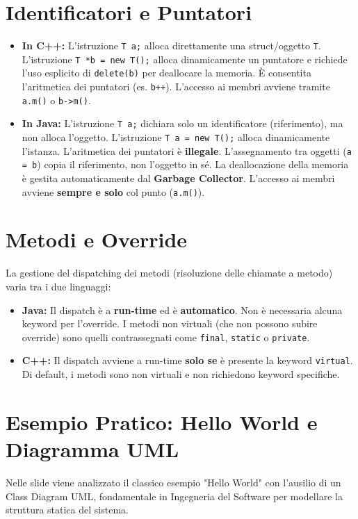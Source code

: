 \documentclass[12pt,a4paper,oneside]{book}
\begin{document}
\section{Identificatori e Puntatori}
\begin{itemize}
    \item \textbf{In C++:} L'istruzione \texttt{T a;} alloca direttamente una struct/oggetto \texttt{T}. L'istruzione \texttt{T *b = new T();} alloca dinamicamente un puntatore e richiede l'uso esplicito di \texttt{delete(b)} per deallocare la memoria. È consentita l'aritmetica dei puntatori (es. \texttt{b++}). L'accesso ai membri avviene tramite \texttt{a.m()} o \texttt{b->m()}.
    \item \textbf{In Java:} L'istruzione \texttt{T a;} dichiara solo un identificatore (riferimento), ma non alloca l'oggetto. L'istruzione \texttt{T a = new T();} alloca dinamicamente l'istanza. L'aritmetica dei puntatori è \textbf{illegale}. L'assegnamento tra oggetti (\texttt{a = b}) copia il riferimento, non l'oggetto in sé. La deallocazione della memoria è gestita automaticamente dal \textbf{Garbage Collector}. L'accesso ai membri avviene \textbf{sempre e solo} col punto (\texttt{a.m()}).
\end{itemize}

\section{Metodi e Override}
La gestione del dispatching dei metodi (risoluzione delle chiamate a metodo) varia tra i due linguaggi:
\begin{itemize}
    \item \textbf{Java:} Il dispatch è a \textbf{run-time} ed è \textbf{automatico}. Non è necessaria alcuna keyword per l'override. I metodi non virtuali (che non possono subire override) sono quelli contrassegnati come \texttt{final}, \texttt{static} o \texttt{private}.
    \item \textbf{C++:} Il dispatch avviene a run-time \textbf{solo se} è presente la keyword \texttt{virtual}. Di default, i metodi sono non virtuali e non richiedono keyword specifiche.
\end{itemize}

\section{Esempio Pratico: Hello World e Diagramma UML}
Nelle slide viene analizzato il classico esempio "Hello World" con l'ausilio di un Class Diagram UML, fondamentale in Ingegneria del Software per modellare la struttura statica del sistema.
\end{document}
